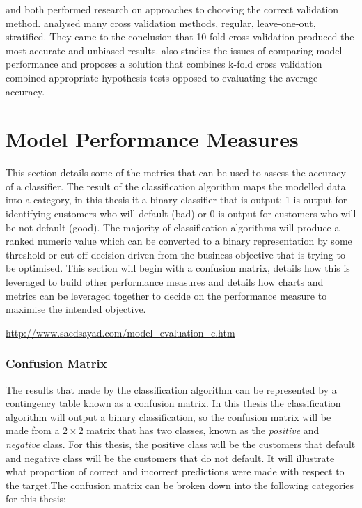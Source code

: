\citep{kohavi_study_1995} and \citep{salzberg_comparing_1997} both performed research on approaches to choosing the correct validation method. \cite{kohavi_study_1995} analysed many cross validation methods, regular, leave-one-out, stratified. They came to the conclusion that 10-fold cross-validation produced the most accurate and unbiased results. \cite{salzberg_comparing_1997} also studies the issues of comparing model performance and proposes a solution that combines k-fold cross validation combined appropriate hypothesis tests opposed to evaluating the average accuracy.   

\section{Model Performance Measures}\label{modelPerformMeasure}

This section details some of the metrics that can be used to assess the accuracy of a classifier. The result of the classification algorithm maps the modelled data into a category, in this thesis it a binary classifier that is output: 1 is output for identifying customers who will default (bad) or 0 is output for customers who will be not-default (good). The majority of classification algorithms will produce a ranked numeric value which can be converted to a binary representation by some threshold or cut-off decision driven from  the business objective that is trying to be optimised. This section will begin with a confusion matrix, details how this is leveraged to build other performance measures and details how charts and metrics can be leveraged together to decide on the performance measure to maximise the intended objective.

\url{http://www.saedsayad.com/model_evaluation_c.htm}

\subsubsection{Confusion Matrix}

The results that made by the classification algorithm can be represented by a contingency table known as a confusion matrix. In this thesis the classification algorithm will output a binary classification, so the confusion matrix will be made from a $2 \times 2$ matrix that has two classes, known as the \textit{positive} and \textit{negative} class. For this thesis, the positive class will be the customers that default and negative class will be the customers that do not default. It will illustrate what proportion of correct and incorrect predictions were made with respect to the target.The confusion matrix can be broken down into the following categories for this thesis:


